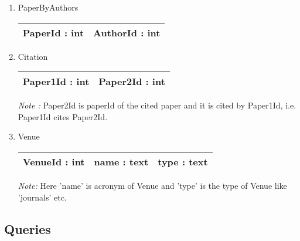\documentclass[10pt]{article}
\begin{document}
\begin{enumerate}
\begin{enumerate}
\item PaperByAuthors\\
        \begin{tabular}{|c|c|}
            \hline 
             PaperId : int & AuthorId : int \\
            \hline
        \end{tabular}
\item Citation\\
        \begin{tabular}{|c|c|}
            \hline
             Paper1Id : int & Paper2Id : int \\
            \hline
        \end{tabular}

\emph{Note :} Paper2Id is paperId of the cited paper and it is cited by Paper1Id, i.e. Paper1Id cites Paper2Id.

\item Venue\\
        \begin{tabular}{|c|c|c|}
            \hline
             VenueId : int & name : text & type : text\\
            \hline
        \end{tabular}

\emph{Note:} Here 'name' is acronym of Venue and 'type' is the type of Venue like 'journals' etc.
\end{enumerate}

\end{enumerate}

\subsection{Queries}
\end{document}
